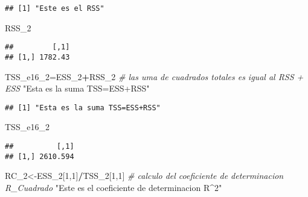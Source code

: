 \documentclass[
]{article}
\newenvironment{Shaded}{\begin{snugshade}}{\end{snugshade}}
\newcommand{\CommentTok}[1]{\textcolor[rgb]{0.56,0.35,0.01}{\textit{#1}}}
\newcommand{\DecValTok}[1]{\textcolor[rgb]{0.00,0.00,0.81}{#1}}
\newcommand{\KeywordTok}[1]{\textcolor[rgb]{0.13,0.29,0.53}{\textbf{#1}}}
\newcommand{\NormalTok}[1]{#1}
\newcommand{\OperatorTok}[1]{\textcolor[rgb]{0.81,0.36,0.00}{\textbf{#1}}}
\newcommand{\StringTok}[1]{\textcolor[rgb]{0.31,0.60,0.02}{#1}}
\begin{document}
\begin{Shaded}
\end{Shaded}

\begin{verbatim}
## [1] "Este es el RSS"
\end{verbatim}

\begin{Shaded}
\begin{Highlighting}[]
\NormalTok{RSS_}\DecValTok{2}
\end{Highlighting}
\end{Shaded}

\begin{verbatim}
##         [,1]
## [1,] 1782.43
\end{verbatim}

\begin{Shaded}
\begin{Highlighting}[]
\NormalTok{TSS_e16_}\DecValTok{2}\NormalTok{=ESS_}\DecValTok{2}\OperatorTok{+}\NormalTok{RSS_}\DecValTok{2}  \CommentTok{# las uma de cuadrados totales es igual al RSS + ESS}
\StringTok{"Esta es la suma TSS=ESS+RSS"}
\end{Highlighting}
\end{Shaded}

\begin{verbatim}
## [1] "Esta es la suma TSS=ESS+RSS"
\end{verbatim}

\begin{Shaded}
\begin{Highlighting}[]
\NormalTok{TSS_e16_}\DecValTok{2}
\end{Highlighting}
\end{Shaded}

\begin{verbatim}
##          [,1]
## [1,] 2610.594
\end{verbatim}

\begin{Shaded}
\begin{Highlighting}[]
\NormalTok{RC_}\DecValTok{2}\NormalTok{<-ESS_}\DecValTok{2}\NormalTok{[}\DecValTok{1}\NormalTok{,}\DecValTok{1}\NormalTok{]}\OperatorTok{/}\NormalTok{TSS_}\DecValTok{2}\NormalTok{[}\DecValTok{1}\NormalTok{,}\DecValTok{1}\NormalTok{]  }\CommentTok{# calculo del coeficiente de determinacion R_Cuadrado}
\StringTok{"Este es el coeficiente de determinacion R^2"}
\end{Highlighting}
\end{Shaded}
\end{document}
